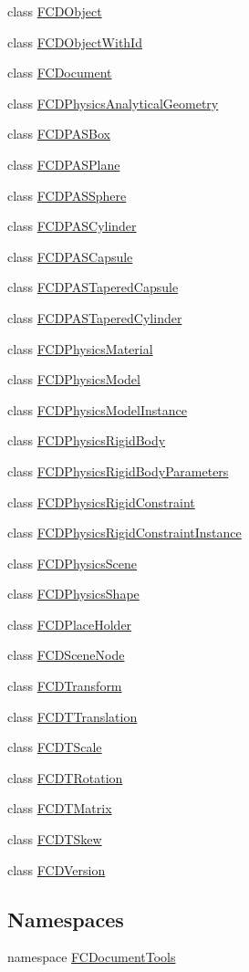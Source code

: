 \begin{DoxyCompactItemize}
\item 
class \hyperlink{classFCDObject}{FCDObject}
\item 
class \hyperlink{classFCDObjectWithId}{FCDObjectWithId}
\item 
class \hyperlink{classFCDocument}{FCDocument}
\item 
class \hyperlink{classFCDPhysicsAnalyticalGeometry}{FCDPhysicsAnalyticalGeometry}
\item 
class \hyperlink{classFCDPASBox}{FCDPASBox}
\item 
class \hyperlink{classFCDPASPlane}{FCDPASPlane}
\item 
class \hyperlink{classFCDPASSphere}{FCDPASSphere}
\item 
class \hyperlink{classFCDPASCylinder}{FCDPASCylinder}
\item 
class \hyperlink{classFCDPASCapsule}{FCDPASCapsule}
\item 
class \hyperlink{classFCDPASTaperedCapsule}{FCDPASTaperedCapsule}
\item 
class \hyperlink{classFCDPASTaperedCylinder}{FCDPASTaperedCylinder}
\item 
class \hyperlink{classFCDPhysicsMaterial}{FCDPhysicsMaterial}
\item 
class \hyperlink{classFCDPhysicsModel}{FCDPhysicsModel}
\item 
class \hyperlink{classFCDPhysicsModelInstance}{FCDPhysicsModelInstance}
\item 
class \hyperlink{classFCDPhysicsRigidBody}{FCDPhysicsRigidBody}
\item 
class \hyperlink{classFCDPhysicsRigidBodyParameters}{FCDPhysicsRigidBodyParameters}
\item 
class \hyperlink{classFCDPhysicsRigidConstraint}{FCDPhysicsRigidConstraint}
\item 
class \hyperlink{classFCDPhysicsRigidConstraintInstance}{FCDPhysicsRigidConstraintInstance}
\item 
class \hyperlink{classFCDPhysicsScene}{FCDPhysicsScene}
\item 
class \hyperlink{classFCDPhysicsShape}{FCDPhysicsShape}
\item 
class \hyperlink{classFCDPlaceHolder}{FCDPlaceHolder}
\item 
class \hyperlink{classFCDSceneNode}{FCDSceneNode}
\item 
class \hyperlink{classFCDTransform}{FCDTransform}
\item 
class \hyperlink{classFCDTTranslation}{FCDTTranslation}
\item 
class \hyperlink{classFCDTScale}{FCDTScale}
\item 
class \hyperlink{classFCDTRotation}{FCDTRotation}
\item 
class \hyperlink{classFCDTMatrix}{FCDTMatrix}
\item 
class \hyperlink{classFCDTSkew}{FCDTSkew}
\item 
class \hyperlink{classFCDVersion}{FCDVersion}
\end{DoxyCompactItemize}
\subsection*{Namespaces}
\begin{DoxyCompactItemize}
\item 
namespace \hyperlink{namespaceFCDocumentTools}{FCDocumentTools}
\end{DoxyCompactItemize}
